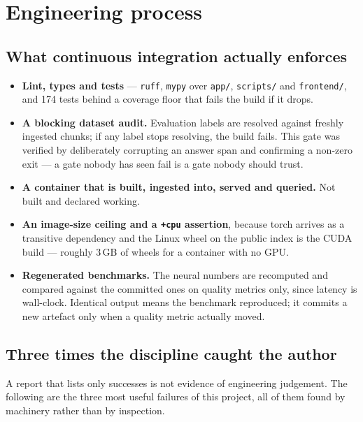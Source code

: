 \documentclass[11pt,a4paper]{article}
\newcommand{\code}[1]{\texttt{\small #1}}
\begin{document}
\section{Engineering process}

\subsection{What continuous integration actually enforces}

\begin{itemize}[leftmargin=1.2em,itemsep=3pt]
  \item \textbf{Lint, types and tests} --- \code{ruff}, \code{mypy} over
        \code{app/}, \code{scripts/} and \code{frontend/}, and 174 tests behind a
        coverage floor that fails the build if it drops.
  \item \textbf{A blocking dataset audit.} Evaluation labels are resolved against
        freshly ingested chunks; if any label stops resolving, the build fails.
        This gate was verified by deliberately corrupting an answer span and
        confirming a non-zero exit --- a gate nobody has seen fail is a gate
        nobody should trust.
  \item \textbf{A container that is built, ingested into, served and queried.}
        Not built and declared working.
  \item \textbf{An image-size ceiling and a \code{+cpu} assertion}, because torch
        arrives as a transitive dependency and the Linux wheel on the public
        index is the CUDA build --- roughly 3\,GB of wheels for a container with
        no GPU.
  \item \textbf{Regenerated benchmarks.} The neural numbers are recomputed and
        compared against the committed ones on quality metrics only, since
        latency is wall-clock. Identical output means the benchmark reproduced;
        it commits a new artefact only when a quality metric actually moved.
\end{itemize}

\subsection{Three times the discipline caught the author}

A report that lists only successes is not evidence of engineering judgement. The
following are the three most useful failures of this project, all of them found
by machinery rather than by inspection.
\end{document}
